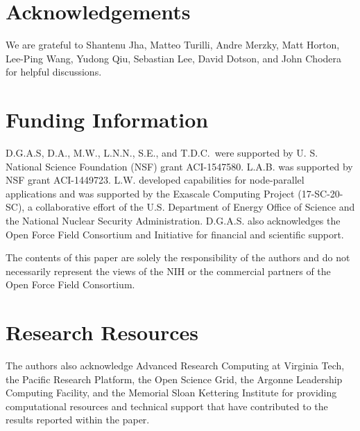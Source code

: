 \documentclass[journal=jctcce,manuscript=article]{achemso}
\begin{document}
\section{Acknowledgements}

We are grateful to Shantenu Jha, Matteo Turilli, Andre Merzky, Matt Horton, Lee-Ping Wang, Yudong Qiu, Sebastian Lee, David Dotson, and John Chodera for helpful discussions.

\section{Funding Information}

D.G.A.S, D.A., M.W., L.N.N., S.E., and T.D.C.\ were supported by U. S. National Science Foundation (NSF) grant ACI-1547580.
L.A.B. was supported by NSF grant ACI-1449723.
L.W. developed capabilities for node-parallel applications and was supported by the Exascale Computing Project (17-SC-20-SC), a collaborative effort of the U.S. Department of Energy Office of Science and the National Nuclear Security Administration.
D.G.A.S. also acknowledges the Open Force Field Consortium and Initiative for financial and scientific support.

The contents of this paper are solely the
responsibility of the authors and do not necessarily represent the views of the NIH or the commercial partners of the Open Force Field Consortium.

\section{Research Resources}

The authors also acknowledge Advanced Research Computing at Virginia Tech, the Pacific Research Platform, the Open Science Grid, the Argonne Leadership Computing Facility, and the Memorial Sloan Kettering Institute for providing computational resources and technical support that have contributed to the results reported within the paper.

 

\end{document}
